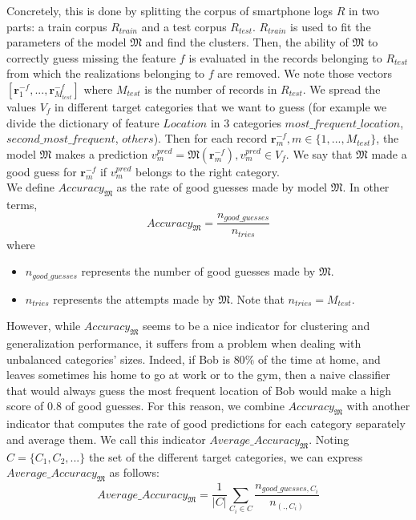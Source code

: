 Concretely, this is done by splitting the corpus of smartphone logs $R$ in two parts: a train corpus $R_{train}$ and a test corpus $R_{test}$. $R_{train}$ is used to fit the parameters of the model $\mathfrak{M}$ and find the clusters. Then, the ability of $\mathfrak{M}$ to correctly guess missing the feature $f$ is evaluated in the records belonging to $R_{test}$  from which the realizations belonging to $f$ are removed. We note those vectors $[ \mathbf{r}_{1}^{-f},...,\mathbf{r}_{M_{test}}^{-f}]$ where $M_{test}$ is the number of records in $R_{test}$.
We spread the values $V_{f}$ in different target categories that we want to guess (for example we divide the dictionary of feature $Location$ in $3$ categories $most\_frequent\_location$, $second\_most\_frequent$, $others$). Then for each record $\mathbf{r}_{m}^{-f}, m \in \{1,...,M_{test}\}$, the model $\mathfrak{M}$ makes a prediction $v_{m}^{pred}=\mathfrak{M}(\mathbf{r}_{m}^{-f}), v_{m}^{pred} \in V_{f}$. We say that $\mathfrak{M}$ made a good guess for $\mathbf{r}_{m}^{-f}$ if $v_{m}^{pred}$ belongs to the right category. 
\\We define $Accuracy_{\mathfrak{M}}$ as the rate of good guesses made by model $\mathfrak{M}$. In other terms,
\begin{equation}
Accuracy_{\mathfrak{M}}=\frac{n_{good\_guesses}}{n_{tries}}
\end{equation}
where 
\begin{itemize} 
	\item $n_{good\_guesses}$  represents the number of good guesses made by $\mathfrak{M}$.
	\item $n_{tries}$ represents the attempts made by $\mathfrak{M}$. Note that $n_{tries}=M_{test}$.
\end{itemize}
However, while $Accuracy_{\mathfrak{M}}$ seems to be a nice indicator for clustering and generalization performance, it suffers from a problem when dealing with unbalanced categories' sizes. Indeed, if Bob is $80\%$ of the time at home, and leaves sometimes his home to go at work or to the gym, then a naive classifier that would always guess the most frequent location of Bob would make a high score of $0.8$ of good guesses. For this reason, we combine $Accuracy_{\mathfrak{M}}$ with another indicator that computes the rate of good predictions for each category separately and average them. We call this indicator $Average\_Accuracy_{\mathfrak{M}}$. Noting $C=\{C_{1},C_{2},...\}$ the set of the different target categories, we can express $Average\_Accuracy_{\mathfrak{M}}$ as follows:
\begin{equation}
Average\_Accuracy_{\mathfrak{M}}=\frac{1}{|C|}\sum_{C_{i}\in C}\frac{n_{good\_guesses,C_{i}}}{n_{(.,C_{i})}}
\end{equation}
